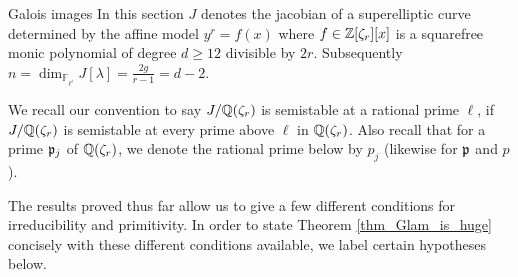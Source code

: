\documentclass[11pt,a4paper]{article}
\newcommand{\Fli}{\mathbb{F}_{\ell^i}}
\newcommand{\Qr}{{\QQ(\zeta_r)}}
\newcommand{\Zr}{{\ZZ[\zeta_r]}}
\begin{document}
\begin{section}{Galois images}
\label{section_Galois_images}
In this section $J$ denotes the jacobian of a superelliptic curve determined by the affine model $y^r = f(x)$ where $f \in \Zr[x]$ is a squarefree monic polynomial of degree $d \geq 12$ divisible by $2r$.
Subsequently $n = \dim_{\Fli}J[\lambda] = \frac{2g}{r-1}=d-2$.

We recall our convention to say $J/\Qr$ is semistable at a rational prime $\ell$, if $J/\Qr$ is semistable at every prime above $\ell$ in $\Qr$.
Also recall that for a prime $\mathfrak{p}_j$ of $\Qr$, we denote the rational prime below by $p_j$ (likewise for $\mathfrak{p}$ and $p$).

The results proved thus far allow us to give a few different conditions for irreducibility and primitivity. In order to state Theorem \ref{thm_Glam_is_huge} concisely with these different conditions available, we label certain hypotheses below.


\end{section}
\end{document}
